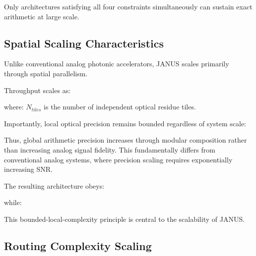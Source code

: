 \documentclass[journal]{IEEEtran}
\begin{document}
\begin{center}
\end{center}

\begin{center}
\end{center}

Only architectures satisfying all four constraints simultaneously can sustain exact arithmetic at large scale.

\subsection{\textbf{Spatial Scaling Characteristics}}

Unlike conventional analog photonic accelerators, JANUS scales primarily through spatial parallelism.

Throughput scales as:
\begin{center}
\end{center}

where: $N_{tiles}$ is the number of independent optical residue tiles.

Importantly, local optical precision remains bounded regardless of system scale:

\begin{center}
\end{center}

Thus, global arithmetic precision increases through modular composition rather than increasing analog signal fidelity. This fundamentally differs from conventional analog systems, where precision scaling requires exponentially increasing SNR.

The resulting architecture obeys:
\begin{center}
\end{center}

while:
\begin{center}
\end{center}

This bounded-local-complexity principle is central to the scalability of JANUS.

\subsection{\textbf{Routing Complexity Scaling}}
\end{document}
